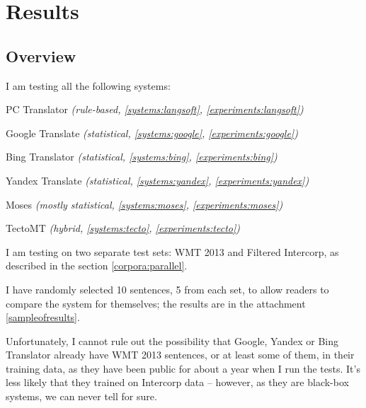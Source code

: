 \chapter{Results}
\label{chapter:results}

\section{Overview}
\label{overvieweval}
I am testing all the following systems:
\begin{pitemize}
\item PC Translator \emph{(rule-based, \ref{systems:langsoft}, \ref{experiments:langsoft})}
\item Google Translate \emph{(statistical, \ref{systems:google}, \ref{experiments:google})}
\item Bing Translator \emph{(statistical, \ref{systems:bing}, \ref{experiments:bing})}
\item Yandex Translate \emph{(statistical, \ref{systems:yandex}, \ref{experiments:yandex})}
\item Moses \emph{(mostly statistical, \ref{systems:moses}, \ref{experiments:moses})}
\item TectoMT \emph{(hybrid, \ref{systems:tecto}, \ref{experiments:tecto})}
\end{pitemize}

I am testing on two separate test sets: WMT 2013 and Filtered Intercorp, as described in the section \ref{corpora:parallel}.

I have randomly selected 10 sentences, 5 from each set, to allow readers to compare the system for themselves; the results are in the attachment \ref{sampleofresults}.

Unfortunately, I cannot rule out the possibility that Google, Yandex or Bing Translator already have WMT 2013 sentences, or at least some of them, in their training data, as they have been public for about a year when I run the tests. It's less likely that they trained on Intercorp data -- however, as they are black-box systems, we can never tell for sure.



